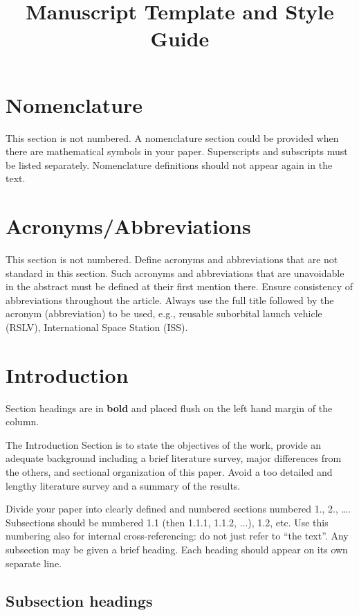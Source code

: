 \documentclass{IACpaper}
\title{
  Manuscript Template and Style Guide
}
\begin{document}
  \IACpaperpreamble %

  \section*{Nomenclature}

    This section is not numbered. A nomenclature section could be provided when there are mathematical symbols in your paper. Superscripts and subscripts must be listed separately. Nomenclature definitions should not appear again in the text.

  \section*{Acronyms/Abbreviations}

    This section is not numbered. Define acronyms and abbreviations that are not standard in this section. Such acronyms and abbreviations that are unavoidable in the abstract must be defined at their first mention there. Ensure consistency of abbreviations throughout the article. Always use the full title followed by the acronym (abbreviation) to be used, e.g., reusable suborbital launch vehicle (RSLV), International Space Station (ISS).

  \section{Introduction}

    Section headings are in \textbf{bold} and placed flush on the left hand margin of the column.

    The Introduction Section is to state the objectives of the work, provide an adequate background including a brief literature survey, major differences from the others, and sectional organization of this paper. Avoid a too detailed and lengthy literature survey and a summary of the results.

    Divide your paper into clearly defined and numbered sections numbered 1., 2., …. Subsections should be numbered 1.1 (then 1.1.1, 1.1.2, ...), 1.2, etc. Use this numbering also for internal cross-referencing: do not just refer to “the text”. Any subsection may be given a brief heading. Each heading should appear on its own separate line.

    \subsection{Subsection headings}
\end{document}
